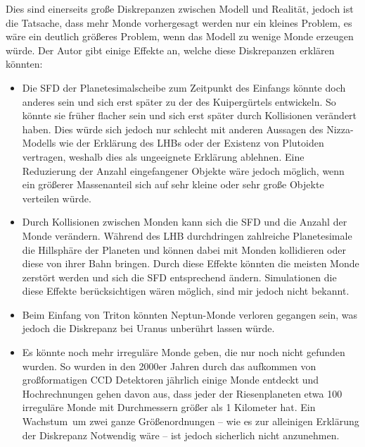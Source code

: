 \documentclass[12pt,a4paper,twoside]{article}
\renewcommand{\cite}{\citep}
\begin{document}
Dies sind einerseits große Diskrepanzen zwischen Modell und Realität, jedoch ist die Tatsache, dass mehr Monde vorhergesagt werden nur ein kleines Problem, es wäre ein deutlich größeres Problem, wenn das Modell zu wenige Monde erzeugen würde. Der Autor gibt einige Effekte an, welche diese Diskrepanzen erklären könnten:
\begin{itemize}
\item Die SFD der Planetesimalscheibe zum Zeitpunkt des Einfangs könnte doch anderes sein und sich erst später zu der des Kuipergürtels entwickeln.
So könnte sie früher flacher sein und sich erst später durch Kollisionen verändert haben. Dies würde sich jedoch nur schlecht mit anderen Aussagen des Nizza-Modells wie der Erklärung des LHBs oder der Existenz von Plutoiden vertragen, %
weshalb \cite{Nesvorny2007} dies als ungeeignete Erklärung ablehnen.
Eine Reduzierung der Anzahl eingefangener Objekte wäre jedoch möglich, wenn ein größerer Massenanteil sich auf sehr kleine oder sehr große Objekte verteilen würde\cite{Nesvorny2007}. %
\item Durch Kollisionen zwischen Monden kann sich die SFD und die Anzahl der Monde verändern. Während des LHB durchdringen zahlreiche Planetesimale die Hillsphäre der Planeten und können dabei mit Monden kollidieren oder diese von ihrer Bahn bringen\cite{Nesvorny2007}. Durch diese Effekte könnten die meisten Monde zerstört werden und sich die SFD entsprechend ändern. Simulationen die diese Effekte berücksichtigen wären möglich, sind mir jedoch nicht bekannt. %
\item Beim Einfang von Triton könnten Neptun-Monde verloren gegangen sein, was jedoch die Diskrepanz bei Uranus unberührt lassen würde\cite{Nesvorny2007}.
\item Es könnte noch mehr irreguläre Monde geben, die nur noch nicht gefunden wurden. So wurden in den 2000er Jahren durch das aufkommen von großformatigen CCD Detektoren jährlich einige Monde entdeckt und Hochrechnungen gehen davon aus, dass jeder der Riesenplaneten etwa 100 irreguläre Monde mit Durchmessern größer als 1 Kilometer  hat\cite{Nicholson2008}.
Ein \glqq Wachstum\grqq\ um zwei ganze Größenordnungen -- wie es zur alleinigen Erklärung der Diskrepanz Notwendig wäre -- ist jedoch sicherlich nicht anzunehmen.
\end{itemize}
\end{document}
